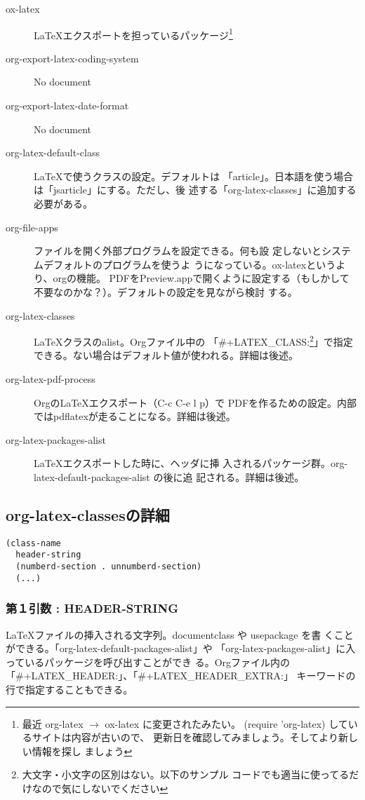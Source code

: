 \documentclass[dvipdfmx,12pt]{jsarticle}
\begin{document}
\begin{description}
\item[{ox-latex}] \LaTeX{}エクスポートを担っているパッケージ\footnote{最近
                org-latex $\rightarrow$ ox-latex に変更されたみたい。
                (require 'org-latex) しているサイトは内容が古いので、
                更新日を確認してみましょう。そしてより新しい情報を探し
                ましょう}
\item[{org-export-latex-coding-system}] No document
\item[{org-export-latex-date-format}] No document
\item[{org-latex-default-class}] \LaTeX{}で使うクラスの設定。デフォルトは
「article」。日本語を使う場合は「jsarticle」にする。ただし、後
述する「org-latex-classes」に追加する必要がある。
\item[{org-file-apps}] ファイルを開く外部プログラムを設定できる。何も設
定しないとシステムデフォルトのプログラムを使うよ
うになっている。ox-latexというより、orgの機能。
PDFをPreview.appで開くように設定する（もしかして
不要なのかな？）。デフォルトの設定を見ながら検討
する。

\item[{org-latex-classes}] \LaTeX{}クラスのalist。Orgファイル中の
「\#+LATEX\_CLASS:\footnote{大文字・小文字の区別はない。以下のサンプル
       コードでも適当に使ってるだけなので気にしないでください}」で指定
できる。ない場合はデフォルト値が使われる。詳細は後述。
\item[{org-latex-pdf-process}] Orgの\LaTeX{}エクスポート（C-c C-e l p）で
PDFを作るための設定。内部ではpdflatexが走ることになる。詳細は後述。
\item[{org-latex-packages-alist}] \LaTeX{}エクスポートした時に、ヘッダに挿
入されるパッケージ群。org-latex-default-packages-alist の後に追
記される。詳細は後述。
\end{description}

\subsection{org-latex-classesの詳細}
\label{sec-3-1}
\lstset{language=Lisp,label= ,caption= ,numbers=none}
\begin{lstlisting}
(class-name
  header-string
  (numberd-section . unnumberd-section)
  (...)
\end{lstlisting}

\subsubsection{第１引数 : HEADER-STRING}
\label{sec-3-1-1}
\LaTeX{}ファイルの挿入される文字列。documentclass や usepackage を書
くことができる。「org-latex-default-packages-alist」や
「org-latex-packages-alist」に入っているパッケージを呼び出すことができ
る。Orgファイル内の「\#+LATEX\_HEADER:」、「\#+LATEX\_HEADER\_EXTRA:」
キーワードの行で指定することもできる。
\end{document}
